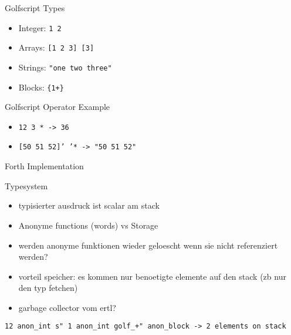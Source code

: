 \documentclass{beamer}
\newcommand{\zwischenueberschrift}[1] { 
    \Huge{#1}
}
\begin{document}
\begin{frame}
    
    \vspace{0.5cm}

    Golfscript Types
    \begin{itemize}
        \item Integer: \texttt{1 2}
        \item Arrays:  \texttt{[1 2 3] [3]}
        \item Strings: \texttt{"one two three"}
        \item Blocks:  \texttt{\{1+\}}
    \end{itemize}

    \vspace{0.5cm}
    \pause 

    Golfscript Operator Example
    \begin{itemize}
        \item \texttt{12 3 * -> 36}
        \item \texttt{[50 51 52]' '* -> "50 51 52"}
    \end{itemize}


\end{frame}


\begin{frame}
\begin{center}
\zwischenueberschrift{Forth Implementation}
\end{center}
\end{frame}


\begin{frame}
    Typesystem
    \begin{itemize}
        \item typisierter ausdruck ist scalar am stack
        \item Anonyme functions (words) vs Storage
        \item werden anonyme funktionen wieder geloescht wenn sie nicht referenziert werden?
        \item vorteil speicher: es kommen nur benoetigte elemente auf den stack (zb nur den typ fetchen)
        \item garbage collector vom ertl?
    \end{itemize}


    \vspace{0.5cm}
\texttt{12 anon\_int s" 1 anon\_int golf\_+" anon\_block -> 2 elements on stack}

\end{frame}
\end{document}
